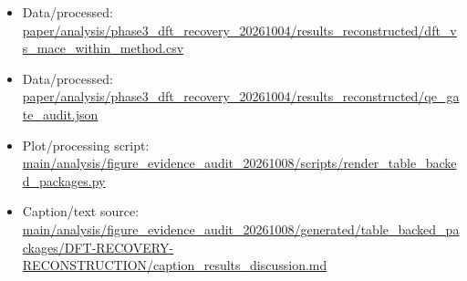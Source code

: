 \begin{itemize}[leftmargin=1.4em,noitemsep]
\item Data/processed: \begingroup\scriptsize\url{paper/analysis/phase3_dft_recovery_20261004/results_reconstructed/dft_vs_mace_within_method.csv}\endgroup
\item Data/processed: \begingroup\scriptsize\url{paper/analysis/phase3_dft_recovery_20261004/results_reconstructed/qe_gate_audit.json}\endgroup
\item Plot/processing script: \begingroup\scriptsize\url{main/analysis/figure_evidence_audit_20261008/scripts/render_table_backed_packages.py}\endgroup
\item Caption/text source: \begingroup\scriptsize\url{main/analysis/figure_evidence_audit_20261008/generated/table_backed_packages/DFT-RECOVERY-RECONSTRUCTION/caption_results_discussion.md}\endgroup
\end{itemize}

